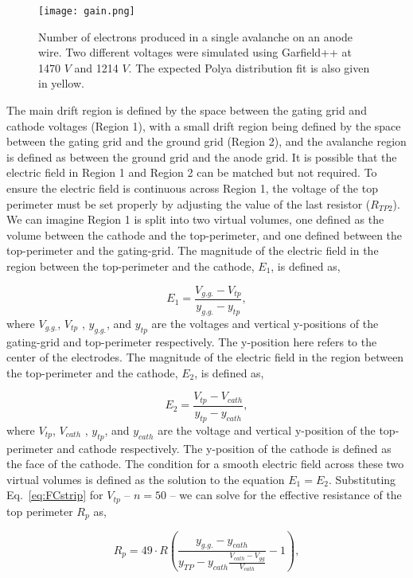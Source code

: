 \begin{figure}[!htb]
\texttt{[image: gain.png]}
\caption{Number of electrons produced in a single avalanche on an anode wire. Two different voltages were simulated using Garfield++ at 1470 $V$ and 1214 $V$. The expected Polya distribution fit is also given in yellow.}
\label{fig:anodegain}
\end{figure}


The main drift region is defined by the space between the gating grid and cathode voltages (Region 1), with a small drift region being defined by the space between the gating grid and the ground grid (Region 2), and the avalanche region is defined as between the ground grid and the anode grid. It is possible that the electric field in Region 1 and Region 2 can be matched but not required.  To ensure the electric field is continuous across Region 1, the voltage of the top perimeter  must be set properly by adjusting the value of the last resistor ($R_{TP2}$). We can imagine Region 1 is split into two virtual volumes, one defined as the volume between the cathode and the top-perimeter, and one defined between the top-perimeter and the gating-grid. The magnitude of the electric field in the region between the top-perimeter and the cathode, $E_1$, is defined as,

\begin{equation}
E_1 = \frac{V_{g.g.} - V_{tp}}{ y_{g.g.} - y_{tp} },
\end{equation}
where  $V_{g.g.}$, $V_{tp}$ , $y_{g.g.}$, and $y_{tp}$ are the voltages and vertical y-positions of the gating-grid and top-perimeter respectively. The y-position here refers to the center of the electrodes. The magnitude of the electric field in the region between the top-perimeter and the cathode, $E_2$, is defined as,

\begin{equation}
E_2 = \frac{V_{tp} - V_{cath}}{ y_{tp} - y_{cath} },
\end{equation}
where  $V_{tp}$, $V_{cath}$ , $y_{tp}$, and $y_{cath}$ are the voltage and vertical y-position of the top-perimeter and cathode respectively. The y-position of the cathode is defined as the face of the cathode. The condition for a smooth electric field across these two virtual volumes is defined as the solution to the equation $E_1 = E_2$. Substituting Eq.~\ref{eq:FCstrip} for $V_{tp}$ -- $n=50$ -- we can solve for the effective resistance of the top perimeter $R_p$ as, 

\begin{equation}
R_p = 49 \cdot R  \left(\frac{ y_{g.g.} - y_{cath} }{ y_{TP} - y_{cath} \frac{V_{cath} - V_{gg}}{V_{cath}} }- 1 \right),
\label{eq:TP_resistor}
\end{equation}

